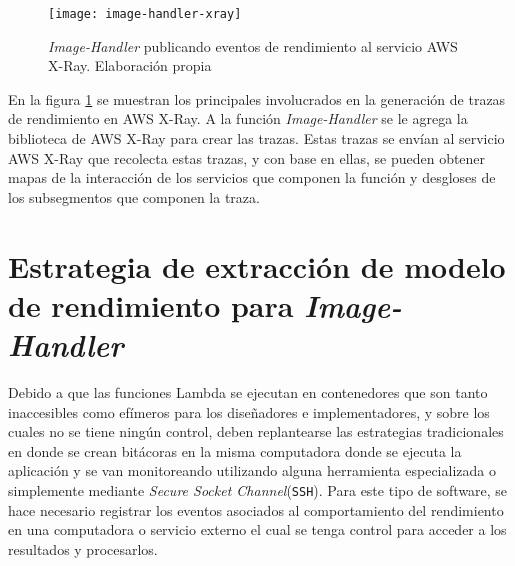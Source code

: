 \begin{figure}[h]
  \centering
  \texttt{[image: image-handler-xray]}
  \caption[\emph{Image-Handler} publicando eventos de rendimiento al servicio AWS X-Ray]{\emph{Image-Handler} publicando eventos de rendimiento al servicio AWS X-Ray. Elaboración propia}
  \label{fig:image-handler-xray}
\end{figure}

En la figura \ref{fig:image-handler-xray} se muestran los principales involucrados en la generación de trazas de rendimiento en AWS X-Ray. A la función \emph{Image-Handler} se le agrega la biblioteca de AWS X-Ray para crear las trazas. Estas trazas se envían al servicio AWS X-Ray que recolecta estas trazas, y con base en ellas, se pueden obtener mapas de la interacción de los servicios que componen la función y desgloses de los subsegmentos que componen la traza.


\section{Estrategia de extracción de modelo de rendimiento para \emph{Image-Handler}} \label{sec:estrategia-de-extraccion-de-modelo}
 
Debido a que las funciones Lambda se ejecutan en contenedores que son tanto inaccesibles como efímeros para los diseñadores e implementadores, y sobre los cuales no se tiene ningún control, deben replantearse las estrategias tradicionales en donde se crean bitácoras en la misma computadora donde se ejecuta la aplicación y se van monitoreando utilizando alguna herramienta especializada o simplemente mediante \emph{Secure Socket Channel}(\texttt{SSH}). Para este tipo de software, se hace necesario registrar los eventos asociados al comportamiento del rendimiento en una computadora o servicio externo el cual se tenga control para acceder a los resultados y procesarlos.

